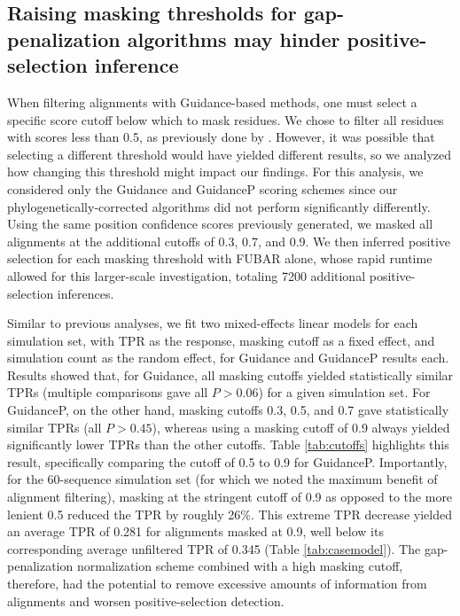 \documentclass[10pt]{article}
\begin{document}
\subsection*{Raising masking thresholds for gap-penalization algorithms may hinder positive-selection inference}

When filtering alignments with Guidance-based methods, one must select a specific score cutoff below which to mask residues. We chose to filter all residues with scores less than 0.5, as previously done by \citet{Jordan2012}. However, it was possible that selecting a different threshold would have yielded different results, so we analyzed how changing this threshold might impact our findings. For this analysis, we considered only the Guidance and GuidanceP scoring schemes since our phylogenetically-corrected algorithms did not perform significantly differently. Using the same position confidence scores previously generated, we masked all alignments at the additional cutoffs of 0.3, 0.7, and 0.9. We then inferred positive selection for each masking threshold with FUBAR alone, whose rapid runtime allowed for this larger-scale investigation, totaling 7200 additional positive-selection inferences.

Similar to previous analyses, we fit two mixed-effects linear models for each simulation set, with TPR as the response, masking cutoff as a fixed effect, and simulation count as the random effect, for Guidance and GuidanceP results each. Results showed that, for Guidance, all masking cutoffs yielded statistically similar TPRs (multiple comparisons gave all $P>0.06$) for a given simulation set. For GuidanceP, on the other hand, masking cutoffs 0.3, 0.5, and 0.7 gave statistically similar TPRs (all $P>0.45$), whereas using a masking cutoff of 0.9 always yielded significantly lower TPRs than the other cutoffs. Table \ref{tab:cutoffs} highlights this result, specifically comparing the cutoff of 0.5 to 0.9 for GuidanceP. Importantly, for the 60-sequence simulation set (for which we noted the maximum benefit of alignment filtering), masking at the stringent cutoff of 0.9 as opposed to the more lenient 0.5 reduced the TPR by roughly 26\%. This extreme TPR decrease yielded an average TPR of 0.281 for alignments masked at 0.9, well below its corresponding average unfiltered TPR of 0.345 (Table \ref{tab:casemodel}). The gap-penalization normalization scheme combined with a high masking cutoff, therefore, had the potential to remove excessive amounts of information from alignments and worsen positive-selection detection. 
\end{document}
